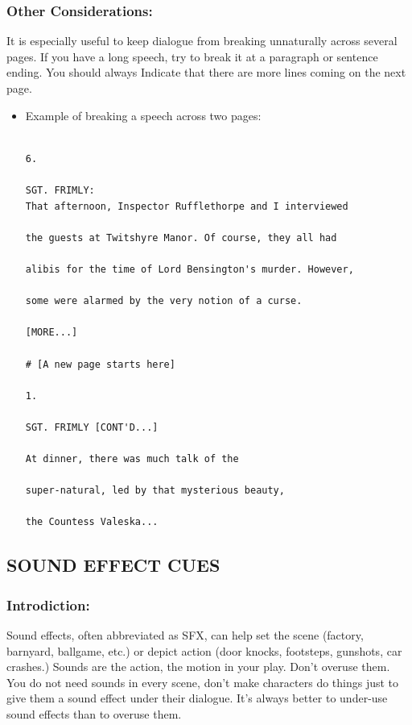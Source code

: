 \documentclass[openleft,oneside,showtrims]{memoir}
\begin{document}
\subsubsection*{Other Considerations:}
\label{sec:org90f2928}

It is especially useful to keep dialogue from breaking unnaturally across several pages. If you have a long speech, try to break it at a paragraph or sentence ending. You should always Indicate that there are more lines coming on the next page.

\begin{itemize}
\item Example of breaking a speech across two pages:
\label{sec:org1c037d8}

\lstset{language=fountain,label= ,caption= ,captionpos=b,numbers=none}
\begin{lstlisting}

6.

SGT. FRIMLY:
That afternoon, Inspector Rufflethorpe and I interviewed
  
the guests at Twitshyre Manor. Of course, they all had 
  
alibis for the time of Lord Bensington's murder. However, 
  
some were alarmed by the very notion of a curse.
  
[MORE...]

# [A new page starts here]

1.

SGT. FRIMLY [CONT'D...]
  
At dinner, there was much talk of the
  
super-natural, led by that mysterious beauty,
  
the Countess Valeska...

\end{lstlisting}
\end{itemize}
\subsection{SOUND EFFECT CUES}
\label{sec:org19ee378}
\subsubsection*{Introdiction:}
\label{sec:org9cd683c}

Sound effects, often abbreviated as SFX, can help set the scene (factory, barnyard, ballgame, etc.) or depict action (door knocks, footsteps, gunshots, car crashes.) Sounds are the action, the motion in your play. Don't overuse them. You do not need sounds in every scene, don't make characters do things just to give them a sound effect under their dialogue. It's always better to under-use sound effects than to overuse them.
\end{document}
